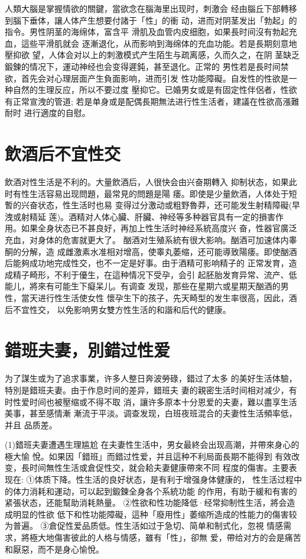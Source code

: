 \documentclass[12pt,UTF8]{ctexbook}
\begin{document}
人類大腦是掌握情欲的關鍵，當欲念在腦海里出现时，刺激会
经由腦丘下部轉移到腦下垂体，讓人体产生想要付諸于「性」的衝
动，进而对阴茎发出「勃起」的指令。男性阴茎的海绵体，富含平
滑肌及血管内皮细胞，如果長时间沒有勃起充血，這些平滑肌就会
逐漸退化，从而影响到海绵体的充血功能。若是長期刻意地壓抑欲
望，人体会对以上的刺激模式产生陌生与疏离感，久而久之，在阴
茎缺乏鍛鍊的情况下，運动神经也会变得遲鈍，甚至退化。正常的
男性若是長时间禁欲，首先会对心理层面产生負面影响，进而引发
性功能障礙。自发性的性欲是一种自然的生理反应，所以不要过度
壓抑它。已婚男女或是有固定性伴侶者，性欲有正常宣洩的管道;
若是单身或是配偶長期無法进行性生活者，建議在性欲高漲難耐时
进行適度的自慰。

\section{飲酒后不宜性交}

飲酒对性生活是不利的。大量飲酒后，人很快会由兴奋期轉入
抑制状态，如果此时有性生活容易出现問題，最常見的問題是陽
痿。即使是少量飲酒，人体处于短暫的兴奋状态，性生活时也易
变得过分激动或粗野魯莽，还可能发生射精障礙(早洩或射精延
莲)。酒精对人体心臟、肝臟、神经等多种器官具有一定的損害作
用。如果全身状态已不甚良好，再加上性生活时神经系統高度兴
奋，性器官廣泛充血，对身体的危害就更大了。
酗酒对生殖系統有很大影响。酗酒可加速体内睾酮的分解，造
成雌激素水准相对增高，使睾丸萎缩，还可能導致陽痿。即使酗酒
后能夠成功地完成性交，也不一定是好事。由于酒精可影响精子的
正常发育，造成精子畸形，不利于優生，在這种情况下受孕，会引
起胚胎发育异常、流产、低能儿，將來有可能生下癡呆儿。有调查
发现，那些在星期六或星期天酗酒的男性，當天进行性生活使女性
懷孕生下的孩子，先天畸型的发生率很高，因此，酒后不宜性交，
以免影响男女雙方性生活的和諧和后代的健康。

\section{錯班夫妻，別錯过性爱}

为了謀生或为了追求事業，许多人整日奔波勞碌，錯过了太多
的美好生活体驗，特別是錯班夫妻。由于作息时间的差异，錯班夫
妻的親密生活时间相对减少，有时性爱时间也被壓缩或不得不取
消，讓许多原本十分恩爱的夫妻，難以盡享生活美事，甚至感情漸
漸流于平淡。调查发现，白班夜班混合的夫妻性生活頻率低，并且
品质差。

(1)錯班夫妻遭遇生理尴尬
在夫妻性生活中，男女最終会出现高潮，并帶來身心的極大愉
悅。如果因「錯班」而錯过性爱，并且這种不利局面長期不能得到
有效改变，長时间無性生活或倉促性交，就会耠夫妻健康帶來不同
程度的傷害。主要表现在:
①体质下降。性生活的良好状态，是有利于增强身体健康的，
性生活过程中的体力消耗和運动，可以起到鍛鍊全身各个系統功能
的作用，有助于緩和有害的紧張状态，还能幫助消耗熱量。
②性欲和性功能降低·经常抑制性生活，將会造成明显的性欲
低下和性功能障礙，這种「廢用性」萎缩所造成的性能力的傷害较
为普遍。
③倉促性爱品质低。性生活如过于急切、简单和制式化，忽視
情感需求，將極大地傷害彼此的人格与情感，雖有「性」，卻無
爱，帶给对方的会是痛苦和厭惡，而不是身心愉悅。
\end{document}
